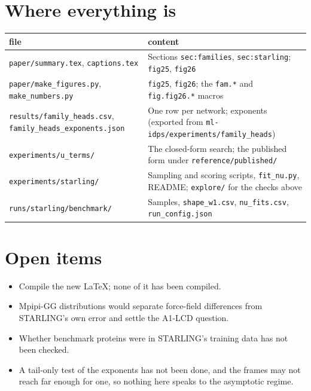\documentclass[11pt]{article}
\begin{document}
\section{Where everything is}
\begin{center}
\small
\begin{tabular}{@{}p{} p{}@{}}
\toprule
file & content\\
\midrule
\texttt{paper/summary.tex}, \texttt{captions.tex} & Sections \texttt{sec:families}, \texttt{sec:starling}; \texttt{fig25}, \texttt{fig26}\\
\texttt{paper/make\_figures.py}, \texttt{make\_numbers.py} & \texttt{fig25}, \texttt{fig26}; the \texttt{fam.*} and \texttt{fig.fig26.*} macros\\
\texttt{results/family\_heads.csv}, \texttt{family\_heads\_exponents.json} & One row per network; exponents (exported from \texttt{ml-idps/experiments/family\_heads})\\
\texttt{experiments/u\_terms/} & The closed-form search; the published form under \texttt{reference/published/}\\
\texttt{experiments/starling/} & Sampling and scoring scripts, \texttt{fit\_nu.py}, README; \texttt{explore/} for the checks above\\
\texttt{runs/starling/benchmark/} & Samples, \texttt{shape\_w1.csv}, \texttt{nu\_fits.csv}, \texttt{run\_config.json}\\
\bottomrule
\end{tabular}
\end{center}

\section{Open items}
\begin{itemize}
\item Compile the new \LaTeX; none of it has been compiled.
\item Mpipi-GG distributions would separate force-field differences from STARLING's own error and settle the A1-LCD question.
\item Whether benchmark proteins were in STARLING's training data has not been checked.
\item A tail-only test of the exponents has not been done, and the frames may not reach far enough for one, so nothing here speaks to the asymptotic regime.
\end{itemize}
\end{document}
